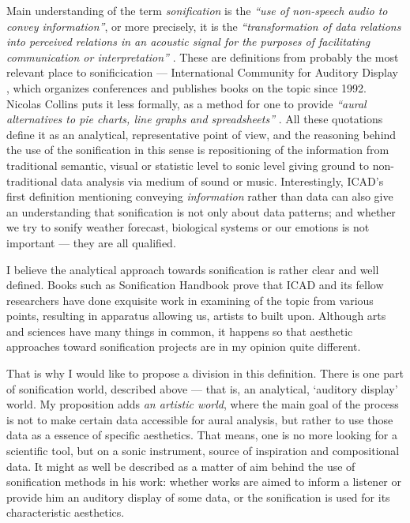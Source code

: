 \documentclass[12pt,a4paper,oneside]{report}
\begin{document}
Main understanding of the term \emph{sonification} is the \emph{``use of non-speech audio to convey information''}, or more precisely, it is the \emph{``transformation of data relations into perceived relations in an acoustic signal for the purposes of facilitating communication or interpretation''} \cite[p.~1]{Fitch}. These are definitions from probably the most relevant place to sonificication --- International Community for Auditory Display \cite{icad}, which organizes conferences and publishes books on the topic since 1992. Nicolas Collins puts it less formally, as a method for one to provide \emph{``aural alternatives to pie charts, line graphs and spreadsheets''} \cite[p.~7]{Collins2006}. All these quotations define it as an analytical, representative point of view, and the reasoning behind the use of the sonification in this sense is repositioning of the information from traditional semantic, visual or statistic level to sonic level giving ground to non-traditional data analysis via medium of sound or music. Interestingly, ICAD's first definition mentioning conveying \emph{information} rather than data can also give an understanding that sonification is not only about data patterns; and whether we try to sonify weather forecast, biological systems or our emotions is not important --- they are all qualified.

I believe the analytical approach towards sonification is rather clear and well defined. Books such as Sonification Handbook \cite{Hermann2011} prove that ICAD and its fellow researchers have done exquisite work in examining of the topic from various points, resulting in apparatus allowing us, artists to built upon. Although arts and sciences have many things in common, it happens so that aesthetic approaches toward sonification projects are in my opinion quite different.


That is why I would like to propose a division in this definition. There is one part of sonification world, described above --- that is, an analytical, `auditory display' world. My proposition adds \emph{an artistic world}, where the main goal of the process is not to make certain data accessible for aural analysis, but rather to use those data as a essence of specific aesthetics. That means, one is no more looking for a scientific tool, but on a sonic instrument, source of inspiration and compositional data. It might as well be described as a matter of aim behind the use of sonification methods in his work: whether works are aimed to inform a listener or provide him an auditory display of some data, or the sonification is used for its characteristic aesthetics.
\end{document}
